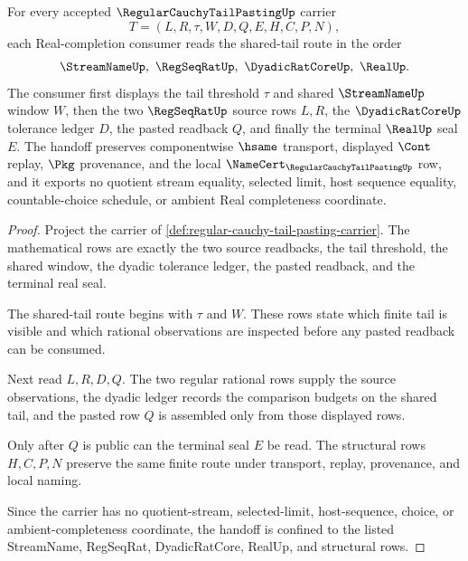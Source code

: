 \begin{theorem}
\label{thm:regular-cauchy-tail-pasting-shared-tail-handoff}
For every accepted $\RegularCauchyTailPastingUp$ carrier
$$
T=(L,R,\tau,W,D,Q,E,H,C,P,N),
$$
each Real-completion consumer reads the shared-tail route in the order
$$
\StreamNameUp,\ \RegSeqRatUp,\ \DyadicRatCoreUp,\ \RealUp .
$$
The consumer first displays the tail threshold $\tau$ and shared $\StreamNameUp$ window $W$, then the two $\RegSeqRatUp$ source rows $L,R$, the $\DyadicRatCoreUp$ tolerance ledger $D$, the pasted readback $Q$, and finally the terminal $\RealUp$ seal $E$. The handoff preserves componentwise $\hsame$ transport, displayed $\Cont$ replay, $\Pkg$ provenance, and the local $\NameCert_{\RegularCauchyTailPastingUp}$ row, and it exports no quotient stream equality, selected limit, host sequence equality, countable-choice schedule, or ambient Real completeness coordinate.
\end{theorem}
\begin{proof}
Project the carrier of \autoref{def:regular-cauchy-tail-pasting-carrier}. The mathematical rows are exactly the two source readbacks, the tail threshold, the shared window, the dyadic tolerance ledger, the pasted readback, and the terminal real seal.

The shared-tail route begins with $\tau$ and $W$. These rows state which finite tail is visible and which rational observations are inspected before any pasted readback can be consumed.

Next read $L,R,D,Q$. The two regular rational rows supply the source observations, the dyadic ledger records the comparison budgets on the shared tail, and the pasted row $Q$ is assembled only from those displayed rows.

Only after $Q$ is public can the terminal seal $E$ be read. The structural rows $H,C,P,N$ preserve the same finite route under transport, replay, provenance, and local naming.

Since the carrier has no quotient-stream, selected-limit, host-sequence, choice, or ambient-completeness coordinate, the handoff is confined to the listed StreamName, RegSeqRat, DyadicRatCore, RealUp, and structural rows.
\end{proof}

